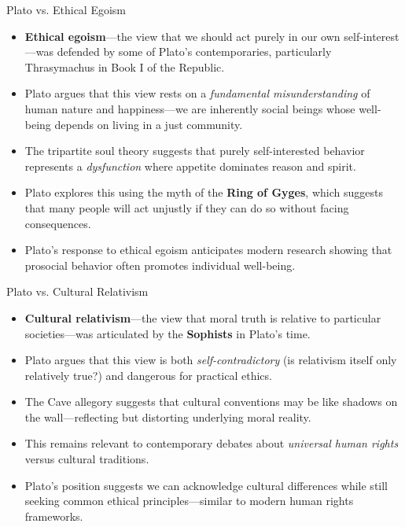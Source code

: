 \documentclass[aspectratio=169]{beamer}
\begin{document}
\begin{frame}{Plato vs. Ethical Egoism}
\begin{itemize}
\item \textbf{Ethical egoism}—the view that we should act purely in our own self-interest—was defended by some of Plato's contemporaries, particularly Thrasymachus in Book I of the Republic.
\item Plato argues that this view rests on a \emph{fundamental misunderstanding} of human nature and happiness—we are inherently social beings whose well-being depends on living in a just community.
\item The tripartite soul theory suggests that purely self-interested behavior represents a \emph{dysfunction} where appetite dominates reason and spirit.
\item Plato explores this using the myth of the \textbf{Ring of Gyges}, which suggests that many people will act unjustly if they can do so without facing consequences.
\item Plato's response to ethical egoism anticipates modern research showing that prosocial behavior often promotes individual well-being.
\end{itemize}
\end{frame}

\begin{frame}{Plato vs. Cultural Relativism}
\begin{itemize}
\item \textbf{Cultural relativism}—the view that moral truth is relative to particular societies—was articulated by the \textbf{Sophists} in Plato's time.
\item Plato argues that this view is both \emph{self-contradictory} (is relativism itself only relatively true?) and dangerous for practical ethics.
\item The Cave allegory suggests that cultural conventions may be like shadows on the wall—reflecting but distorting underlying moral reality.
\item This remains relevant to contemporary debates about \emph{universal human rights} versus cultural traditions.
\item Plato's position suggests we can acknowledge cultural differences while still seeking common ethical principles—similar to modern human rights frameworks.
\end{itemize}
\end{frame}
\end{document}
